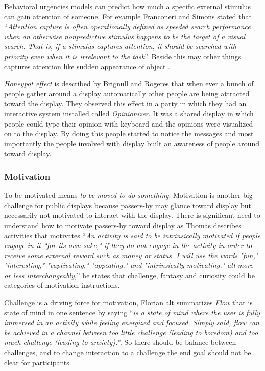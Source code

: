 Behavioral urgencies models can predict how much a specific external stimulus can gain attention of someone. For example Franconeri and Simons \cite{franconeri} stated that ``\emph{Attention capture is often operationally defined as speeded search performance when an otherwise nonpredictive stimulus happens to be the target of a visual search. That is, if a stimulus captures attention, it should be searched with priority even when it is irrelevant to the task}''. Beside this may other things captures attention like sudden appearance of object \cite{capturingattention}.

\emph{Honeypot effect} is described by Brignull and Rogeres \cite{EnticingPeople} that when ever a bunch of people gather around a display automatically other people are being attracted toward the display. They observed this effect in a party in which they had an interactive system installed called \emph{Opinionizer}. It was a shared display in which people could type their opinion with keyboard and the opinions were visualized on to the display. By doing this people started to notice the messages and most importantly the people involved with display built an awareness of people around toward display.


\subsubsection{Motivation}
To be motivated means \emph{to be moved to do something}\cite{motiv}.
Motivation is another big challenge for public displays because passers-by may glance toward display but necessarily not motivated to interact with the display. There is significant need to understand how to motivate passers-by toward display as Thomas \cite{toward_motivation} describes activities that motivates ``\emph{An activity is said to be intrinsically motivated if people engage in it “for its own sake," if they do not engage in the activity in order to receive some external reward such as money or status. I will use the words "fun," "interesting," "captivating," "appealing," and "intrinsically motivating," all more or less interchangeably,}'' he states that challenge, fantasy and curiosity could be categories of motivation instructions.

Challenge is a driving force for motivation, Florian alt \cite{pervasiv_ad} summarizes \emph{Flow}\cite{flow} that is state of mind in one sentence by saying ``\emph{is a state of mind where the user is fully immersed in an activity while feeling energized and focused. Simply said, flow can be achieved in a channel between too little challenge (leading to boredom) and too much challenge (leading to anxiety).}''. So there should be balance between challenges, and to change interaction to a challenge the end goal should not be clear for participants.   

